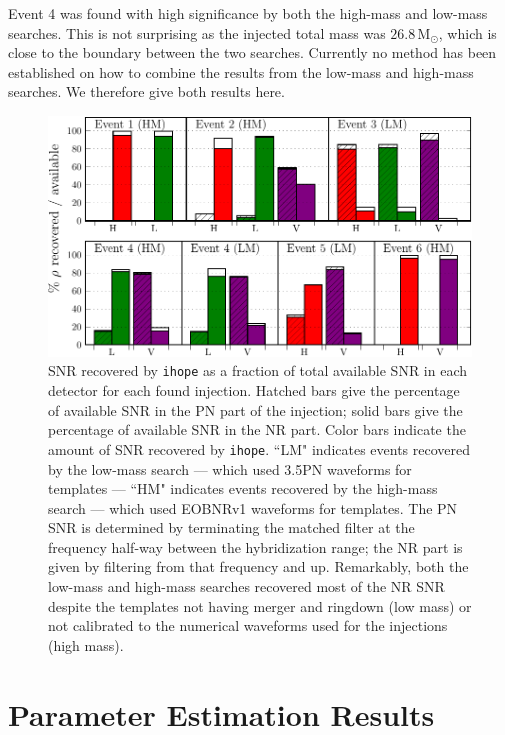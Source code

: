 \documentclass[12pt]{iopart}
\newcommand{\ihope}{\texttt{ihope}}
\begin{document}
Event 4 was found with high significance by both the high-mass and low-mass
searches. This is not surprising as the injected total mass was
$26.8\,\mathrm{M}_\odot$, which is close to the boundary between the two
searches. Currently no method has been established on how to combine the
results from the low-mass and high-mass searches. We therefore give both
results here.

\begin{figure}
  \centerline{\includegraphics[width=\columnwidth]{figure5}}
  \caption[SNR distribution]{\label{fig:snrDistribution}
SNR recovered by \ihope{} as a fraction of total available SNR in each detector
for each found injection. Hatched bars give the percentage of available SNR in
the PN part of the injection; solid bars give the percentage of available SNR
in the NR part. Color bars indicate the amount of SNR recovered by \ihope{}.
``LM" indicates events recovered by the low-mass search --- which used 3.5PN
waveforms for templates --- ``HM" indicates events recovered by the high-mass
search --- which used EOBNRv1 waveforms for templates. The PN SNR is determined
by terminating the matched filter at the frequency half-way between the
hybridization range; the NR part is given by filtering from that frequency and
up.  Remarkably, both the low-mass and high-mass searches recovered most of the
NR SNR despite the templates not having merger and ringdown (low mass) or not
calibrated to the numerical waveforms used for the injections (high mass).
  }
\end{figure}

\section{Parameter Estimation Results}
\label{sec:param_estimation}
\end{document}
